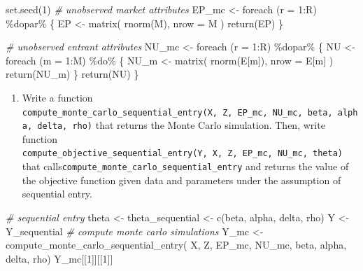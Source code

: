 \documentclass[
]{book}
\newenvironment{Shaded}{\begin{snugshade}}{\end{snugshade}}
\newcommand{\AttributeTok}[1]{\textcolor[rgb]{0.77,0.63,0.00}{#1}}
\newcommand{\CommentTok}[1]{\textcolor[rgb]{0.56,0.35,0.01}{\textit{#1}}}
\newcommand{\DecValTok}[1]{\textcolor[rgb]{0.00,0.00,0.81}{#1}}
\newcommand{\FunctionTok}[1]{\textcolor[rgb]{0.00,0.00,0.00}{#1}}
\newcommand{\NormalTok}[1]{#1}
\newcommand{\OtherTok}[1]{\textcolor[rgb]{0.56,0.35,0.01}{#1}}
\newcommand{\SpecialCharTok}[1]{\textcolor[rgb]{0.00,0.00,0.00}{#1}}
\providecommand{\tightlist}{%
  \setlength{\itemsep}{0pt}\setlength{\parskip}{0pt}}
\begin{document}
\begin{Shaded}
\begin{Highlighting}[]
 \FunctionTok{set.seed}\NormalTok{(}\DecValTok{1}\NormalTok{)}
\CommentTok{\# unobserved market attributes}
\NormalTok{EP\_mc }\OtherTok{\textless{}{-}}
  \FunctionTok{foreach}\NormalTok{ (}\AttributeTok{r =} \DecValTok{1}\SpecialCharTok{:}\NormalTok{R) }\SpecialCharTok{\%dopar\%}\NormalTok{ \{}
\NormalTok{    EP }\OtherTok{\textless{}{-}} \FunctionTok{matrix}\NormalTok{(}
      \FunctionTok{rnorm}\NormalTok{(M),}
      \AttributeTok{nrow =}\NormalTok{ M}
\NormalTok{    )}
    \FunctionTok{return}\NormalTok{(EP)}
\NormalTok{  \}}

\CommentTok{\# unobserved entrant attributes}
\NormalTok{NU\_mc }\OtherTok{\textless{}{-}}
  \FunctionTok{foreach}\NormalTok{ (}\AttributeTok{r =} \DecValTok{1}\SpecialCharTok{:}\NormalTok{R) }\SpecialCharTok{\%dopar\%}\NormalTok{ \{}
\NormalTok{  NU }\OtherTok{\textless{}{-}}
    \FunctionTok{foreach}\NormalTok{ (}\AttributeTok{m =} \DecValTok{1}\SpecialCharTok{:}\NormalTok{M) }\SpecialCharTok{\%do\%}\NormalTok{ \{}
\NormalTok{      NU\_m }\OtherTok{\textless{}{-}} \FunctionTok{matrix}\NormalTok{(}
        \FunctionTok{rnorm}\NormalTok{(E[m]),}
        \AttributeTok{nrow =}\NormalTok{ E[m]}
\NormalTok{      )}
      \FunctionTok{return}\NormalTok{(NU\_m)}
\NormalTok{    \}}
  \FunctionTok{return}\NormalTok{(NU)}
\NormalTok{  \}}
\end{Highlighting}
\end{Shaded}

\begin{enumerate}
\def\labelenumi{\arabic{enumi}.}
\setcounter{enumi}{1}
\tightlist
\item
  Write a function \texttt{compute\_monte\_carlo\_sequential\_entry(X,\ Z,\ EP\_mc,\ NU\_mc,\ beta,\ alpha,\ delta,\ rho)} that returns the Monte Carlo simulation. Then, write function \texttt{compute\_objective\_sequential\_entry(Y,\ X,\ Z,\ EP\_mc,\ NU\_mc,\ theta)} that calls\texttt{compute\_monte\_carlo\_sequential\_entry} and returns the value of the objective function given data and parameters under the assumption of sequential entry.
\end{enumerate}

\begin{Shaded}
\begin{Highlighting}[]
\CommentTok{\# sequential entry}
\NormalTok{theta }\OtherTok{\textless{}{-}}\NormalTok{ theta\_sequential }\OtherTok{\textless{}{-}}
  \FunctionTok{c}\NormalTok{(beta, alpha, delta, rho)}
\NormalTok{Y }\OtherTok{\textless{}{-}}\NormalTok{ Y\_sequential}
\CommentTok{\# compute monte carlo simulations }
\NormalTok{Y\_mc }\OtherTok{\textless{}{-}} 
  \FunctionTok{compute\_monte\_carlo\_sequential\_entry}\NormalTok{(}
\NormalTok{    X, Z, EP\_mc, NU\_mc, beta, alpha, delta, rho)}
\NormalTok{Y\_mc[[}\DecValTok{1}\NormalTok{]][[}\DecValTok{1}\NormalTok{]]}
\end{Highlighting}
\end{Shaded}
\end{document}

